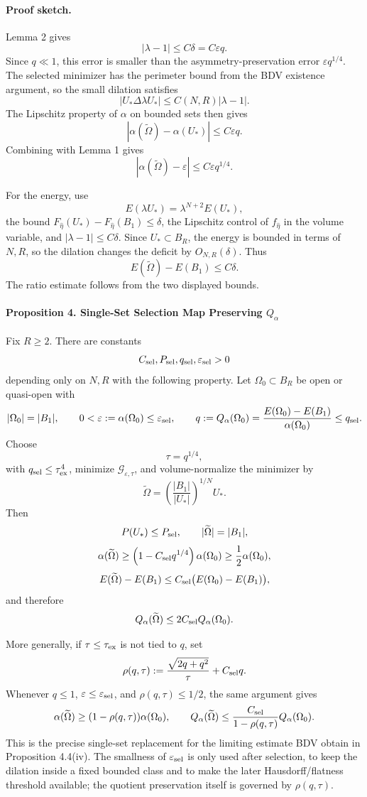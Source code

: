 \documentclass[11pt]{amsart}
\theoremstyle{definition}
\begin{document}
\paragraph{Proof sketch.}
Lemma 2 gives
\[
|\lambda-1|\le C\delta=C\varepsilon q.
\]
Since \(q\ll1\), this error is smaller than the asymmetry-preservation error
\(\varepsilon q^{1/4}\). The selected minimizer has the perimeter bound from
the BDV existence argument, so the small dilation satisfies
\[
|U_*\Delta \lambda U_*|
\le C(N,R)|\lambda-1|.
\]
The Lipschitz property of \(\alpha\) on bounded sets then gives
\[
|\alpha(\widetilde\Omega)-\alpha(U_*)|
\le C\varepsilon q.
\]
Combining with Lemma 1 gives
\[
|\alpha(\widetilde\Omega)-\varepsilon|
\le C\varepsilon q^{1/4}.
\]

For the energy, use
\[
E(\lambda U_*)=\lambda^{N+2}E(U_*),
\]
the bound \(F_{\hat\eta}(U_*)-F_{\hat\eta}(B_1)\le\delta\), the Lipschitz
control of \(f_{\hat\eta}\) in the volume variable, and
\(|\lambda-1|\le C\delta\). Since \(U_*\subset B_R\), the energy is bounded in
terms of \(N,R\), so the dilation changes the deficit by \(O_{N,R}(\delta)\).
Thus
\[
E(\widetilde\Omega)-E(B_1)\le C\delta.
\]
The ratio estimate follows from the two displayed bounds.

\paragraph{Proposition 4. Single-Set Selection Map Preserving \(Q_\alpha\)}

Fix \(R\ge2\). There are constants
\[
C_{\rm sel},P_{\rm sel},q_{\rm sel},\varepsilon_{\rm sel}>0
\]
depending only on \(N,R\) with the following property. Let
\(\Omega_0\subset B_R\) be open or quasi-open with
\[
|\Omega_0|=|B_1|,
\qquad
0<\varepsilon:=\alpha(\Omega_0)\le\varepsilon_{\rm sel},
\qquad
q:=Q_\alpha(\Omega_0)=\frac{E(\Omega_0)-E(B_1)}{\alpha(\Omega_0)}
\le q_{\rm sel}.
\]
Choose
\[
\tau=q^{1/4},
\]
with \(q_{\rm sel}\le\tau_{\rm ex}^4\), minimize
\(\mathcal G_{\varepsilon,\tau}\), and volume-normalize the minimizer by
\[
\widetilde\Omega
=
\left(\frac{|B_1|}{|U_*|}\right)^{1/N}U_*.
\]
Then
\[
P(U_*)\le P_{\rm sel},
\qquad
|\widetilde\Omega|=|B_1|,
\]
\[
\alpha(\widetilde\Omega)
\ge
\left(1-C_{\rm sel}q^{1/4}\right)\alpha(\Omega_0)
\ge
\frac12\alpha(\Omega_0),
\]
\[
E(\widetilde\Omega)-E(B_1)
\le
C_{\rm sel}\bigl(E(\Omega_0)-E(B_1)\bigr),
\]
and therefore
\[
Q_\alpha(\widetilde\Omega)
\le
2C_{\rm sel}Q_\alpha(\Omega_0).
\]

More generally, if \(\tau\le\tau_{\rm ex}\) is not tied to \(q\), set
\[
\rho(q,\tau)
:=
\frac{\sqrt{2q+q^2}}{\tau}+C_{\rm sel}q.
\]
Whenever \(q\le1\), \(\varepsilon\le\varepsilon_{\rm sel}\), and
\(\rho(q,\tau)\le1/2\), the same argument gives
\[
\alpha(\widetilde\Omega)\ge(1-\rho(q,\tau))\alpha(\Omega_0),
\qquad
Q_\alpha(\widetilde\Omega)
\le
\frac{C_{\rm sel}}{1-\rho(q,\tau)}Q_\alpha(\Omega_0).
\]
This is the precise single-set replacement for the limiting estimate BDV
obtain in Proposition 4.4(iv). The smallness of \(\varepsilon_{\rm sel}\) is
only used after selection, to keep the dilation inside a fixed bounded class
and to make the later Hausdorff/flatness threshold available; the quotient
preservation itself is governed by \(\rho(q,\tau)\).
\end{document}
